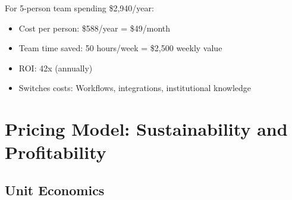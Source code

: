 \documentclass{report}
\begin{document}
For 5-person team spending \$2,940/year:

\begin{itemize}
    \item Cost per person: \$588/year = \$49/month
    \item Team time saved: 50 hours/week = \$2,500 weekly value
    \item ROI: 42x (annually)
    \item Switches costs: Workflows, integrations, institutional knowledge
\end{itemize}

\section{Pricing Model: Sustainability and Profitability}

\subsection{Unit Economics}
\end{document}
